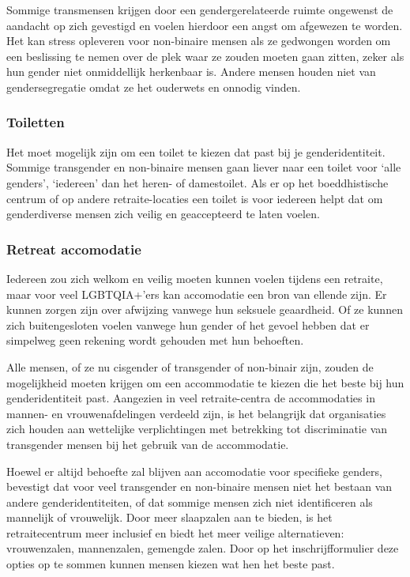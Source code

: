 \documentclass[12pt,openany]{book}
\begin{document}
Sommige transmensen krijgen door een gendergerelateerde ruimte ongewenst de aandacht op zich gevestigd en voelen hierdoor een angst om afgewezen te worden. Het kan stress opleveren voor non-binaire mensen als ze gedwongen worden om een beslissing te nemen over de plek waar ze zouden moeten gaan zitten, zeker als hun gender niet onmiddellijk herkenbaar is. Andere mensen houden niet van gendersegregatie omdat ze het ouderwets en onnodig vinden.

\subsubsection*{Toiletten}

Het moet mogelijk zijn om een toilet te kiezen dat past bij je genderidentiteit. Sommige transgender en non-binaire mensen gaan liever naar een toilet voor `alle genders', `iedereen' dan het heren- of damestoilet. Als er op het boeddhistische centrum of op andere retraite-locaties een toilet is voor iedereen helpt dat om genderdiverse mensen zich veilig en geaccepteerd te laten voelen.

\subsubsection*{Retreat accomodatie}

Iedereen zou zich welkom en veilig moeten kunnen voelen tijdens een retraite, maar voor veel LGBTQIA+'ers kan accomodatie een bron van ellende zijn. Er kunnen zorgen zijn over afwijzing vanwege hun seksuele geaardheid. Of ze kunnen zich buitengesloten voelen vanwege hun gender of het gevoel hebben dat er simpelweg geen rekening wordt gehouden met hun behoeften. 

Alle mensen, of ze nu cisgender of transgender of non-binair zijn, zouden de mogelijkheid moeten krijgen om een accommodatie te kiezen die het beste bij hun genderidentiteit past. Aangezien in veel retraite-centra de accommodaties in mannen- en vrouwenafdelingen verdeeld zijn, is het belangrijk dat organisaties zich houden aan wettelijke verplichtingen met betrekking tot discriminatie van transgender mensen bij het gebruik van de accommodatie.

Hoewel er altijd behoefte zal blijven aan accomodatie voor specifieke genders, bevestigt dat voor veel transgender en non-binaire mensen niet het bestaan van andere genderidentiteiten, of dat sommige mensen zich niet identificeren als mannelijk of vrouwelijk. Door meer slaapzalen aan te bieden, is het retraitecentrum meer inclusief en biedt het meer veilige alternatieven: vrouwenzalen, mannenzalen, gemengde zalen. Door op het inschrijfformulier deze opties op te sommen kunnen mensen kiezen wat hen het beste past.
\end{document}
